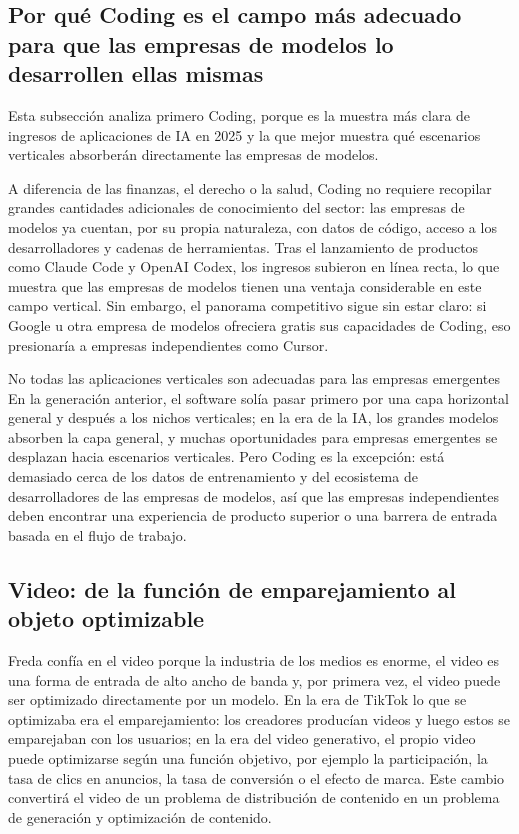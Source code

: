\documentclass[a4paper]{article}
\begin{document}
\subsection{Por qué Coding es el campo más adecuado para que las empresas de modelos lo desarrollen ellas mismas}

Esta subsección analiza primero Coding, porque es la muestra más clara de ingresos de aplicaciones de IA en 2025 y la que mejor muestra qué escenarios verticales absorberán directamente las empresas de modelos.

A diferencia de las finanzas, el derecho o la salud, Coding no requiere recopilar grandes cantidades adicionales de conocimiento del sector: las empresas de modelos ya cuentan, por su propia naturaleza, con datos de código, acceso a los desarrolladores y cadenas de herramientas. Tras el lanzamiento de productos como Claude Code y OpenAI Codex, los ingresos subieron en línea recta, lo que muestra que las empresas de modelos tienen una ventaja considerable en este campo vertical. Sin embargo, el panorama competitivo sigue sin estar claro: si Google u otra empresa de modelos ofreciera gratis sus capacidades de Coding, eso presionaría a empresas independientes como Cursor.

\begin{warningbox}{No todas las aplicaciones verticales son adecuadas para las empresas emergentes}
En la generación anterior, el software solía pasar primero por una capa horizontal general y después a los nichos verticales; en la era de la IA, los grandes modelos absorben la capa general, y muchas oportunidades para empresas emergentes se desplazan hacia escenarios verticales. Pero Coding es la excepción: está demasiado cerca de los datos de entrenamiento y del ecosistema de desarrolladores de las empresas de modelos, así que las empresas independientes deben encontrar una experiencia de producto superior o una barrera de entrada basada en el flujo de trabajo.
\end{warningbox}

\subsection{Video: de la función de emparejamiento al objeto optimizable}

Freda confía en el video porque la industria de los medios es enorme, el video es una forma de entrada de alto ancho de banda y, por primera vez, el video puede ser optimizado directamente por un modelo. En la era de TikTok lo que se optimizaba era el emparejamiento: los creadores producían videos y luego estos se emparejaban con los usuarios; en la era del video generativo, el propio video puede optimizarse según una función objetivo, por ejemplo la participación, la tasa de clics en anuncios, la tasa de conversión o el efecto de marca. Este cambio convertirá el video de un problema de distribución de contenido en un problema de generación y optimización de contenido.
\end{document}
